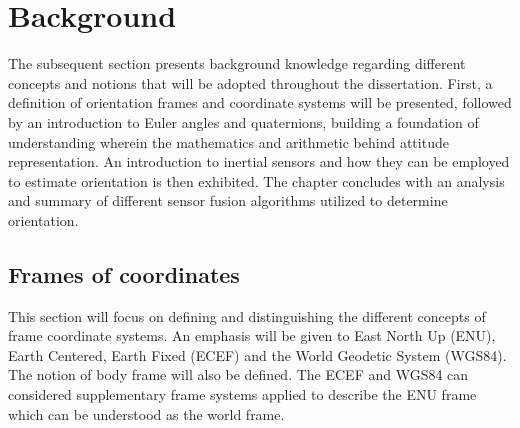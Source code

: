 \section{Background}
The subsequent section presents background knowledge regarding different concepts and notions that will be adopted throughout the dissertation.
First, a definition of orientation frames and coordinate systems will be presented, followed by an introduction to Euler angles and quaternions, building a foundation of understanding wherein the mathematics and arithmetic behind attitude representation. An introduction to inertial sensors and how they can be employed to estimate orientation is then exhibited. The chapter concludes with an analysis and summary of different sensor fusion algorithms utilized to determine orientation.
\subsection{Frames of coordinates}
This section will focus on defining and distinguishing the different concepts of frame coordinate systems. An emphasis will be given to East North Up (ENU), Earth Centered, Earth Fixed (ECEF) and the World Geodetic System (WGS84). The notion of body frame will also be defined. The ECEF and WGS84 can considered supplementary frame systems applied to describe the ENU frame which can be understood as the world frame.
